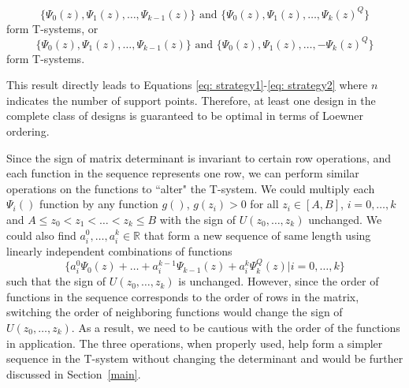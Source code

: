 \documentclass[12pt]{TD-CJS}
\begin{document}
\begin{equation}
    \{\Psi_0(z),\Psi_1(z),\ldots, \Psi_{k-1}(z)\} \text{ and }  \{\Psi_0(z),\Psi_1(z),\ldots, \Psi_k(z)^Q\}
    \label{eq: 3.5}
\end{equation} form T-systems, or\begin{equation}\label{eq: 3.6}
    \{\Psi_0(z),\Psi_1(z),\ldots,\Psi_{k-1}(z)\} \text{ and }  \{\Psi_0(z),\Psi_1(z),\ldots, -\Psi_k(z)^Q\} 
\end{equation}
     form T-systems.

This result directly leads to Equations \eqref{eq: strategy1}-\eqref{eq: strategy2} where $n$ indicates the number of support points. Therefore, at least one design in the complete class of designs is guaranteed to be optimal in terms of Loewner ordering. 

Since the sign of matrix determinant is invariant to certain row operations, and each function in the sequence represents one row, we can perform similar operations on the functions to ``alter" the T-system.  We could multiply each $\Psi_i()$ function by any function $g()$, $g(z_i)>0$ for all $z_i\in [A,B]$, $i=0,\ldots,k$ and $A\le z_0 <z_1< \ldots< z_k\le B$ with the sign of $U(z_0,\ldots,z_k)$ unchanged. We could also find $a^0_i,\ldots,a^k_i\in \mathbb{R}$ that form a new sequence of same length using linearly independent combinations of functions \[\{a^0_i\Psi_0(z)+\ldots+a^{k-1}_i\Psi_{k-1}(z)+a^k_i\Psi_k^Q(z) | i=0,\ldots,k\}\] such that the sign of $U(z_0,\ldots,z_k)$ is unchanged. However, since the order of functions in the sequence corresponds to the order of rows in the matrix, switching the order of neighboring functions would change the sign of $U(z_0,\ldots,z_k)$. As a result, we need to be cautious with the order of the functions in application. The three operations, when properly used, help form a simpler sequence in the T-system without changing the determinant and would be further discussed in Section~\ref{main}.
\end{document}
